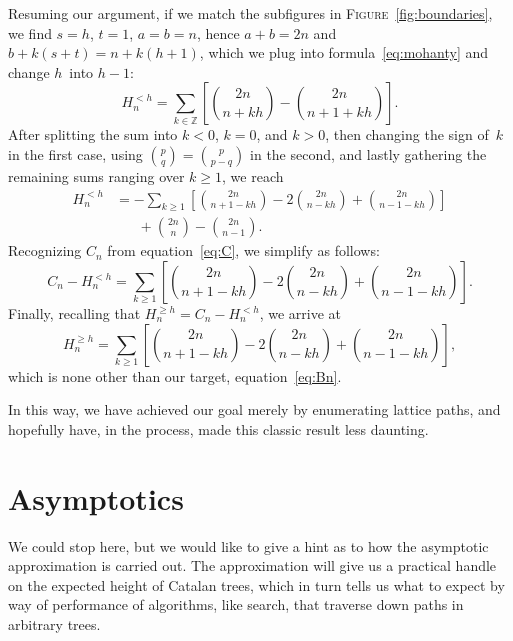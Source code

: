 \documentclass[11pt]{article}
\newcommand\fig{\textsc{Figure}}
\newcommand{\A}[2]{H_{#1}^{<#2}}
\newcommand{\B}[2]{H_{#1}^{\geqslant #2}}
\begin{document}
Resuming our argument, if we match the subfigures in
\fig~\ref{fig:boundaries}, we find \(s=h\), \(t=1\), \(a=b=n\),
hence \(a+b=2n\) and \(b+k(s+t)=n+k(h+1)\),
which we plug into formula~\eqref{eq:mohanty} and change \(h\)~into \(h-1\):
\begin{equation*}
\A{n}{h} = \sum_{k \in \mathbb{Z}}\left[\binom{2n}{n+kh} -
           \binom{2n}{n+1+kh}\right].
\end{equation*}
After splitting the sum into \(k<0\), \(k=0\), and \(k>0\), then
changing the sign of~\(k\) in the first case, using \(\binom{p}{q} =
\binom{p}{p-q}\) in the second, and lastly gathering the remaining
sums ranging over \(k \geqslant 1\), we reach
\begin{align*}
\A{n}{h}
  &= - \sum_{k \geqslant 1}\left[\binom{2n}{n+1-kh} -
    2\binom{2n}{n-kh} + \binom{2n}{n-1-kh}\right]\\
  &\phantom{=}\; + \binom{2n}{n} - \binom{2n}{n-1}.
\end{align*}
Recognizing \(C_n\) from equation~\eqref{eq:C}, we simplify as follows:
\begin{equation*}
C_n - \A{n}{h}
  = \sum_{k \geqslant 1}\left[\binom{2n}{n+1-kh} -
    2\binom{2n}{n-kh} + \binom{2n}{n-1-kh}\right].
\end{equation*}
Finally, recalling that \(\B{n}{h} =  C_n - \A{n}{h}\),
we arrive at
\begin{equation*}
\B{n}{h} = \sum_{k \geqslant 1}
            \left[\binom{2n}{n+1-kh} - 2\binom{2n}{n-kh}
            + \binom{2n}{n-1-kh}\right],
\end{equation*}
which is none other than our target, equation~\eqref{eq:Bn}.

In this way, we have achieved our goal merely by enumerating lattice
paths, and hopefully have, in the process, made this classic result
less daunting.

\section*{Asymptotics}

We could stop here, but we would like to give a hint as to how the
asymptotic approximation is carried out.  The approximation will give
us a practical handle on the expected height of Catalan trees, which
in turn tells us what to expect by way of performance of algorithms,
like search, that traverse down paths in arbitrary trees.
\end{document}
